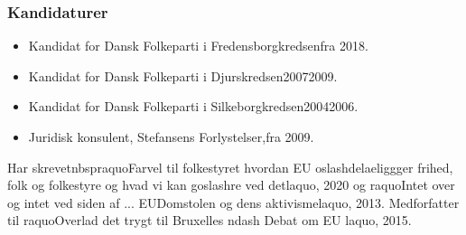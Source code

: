 \documentclass[11pt, a4paper]{awesome-cv}
\begin{document}
\begin{cvletter}
\subsubsection*{Kandidaturer}
\begin{itemize}
\item Kandidat for Dansk Folkeparti i Fredensborgkredsenfra 2018.
\item Kandidat for Dansk Folkeparti i Djurskredsen20072009.
\item Kandidat for Dansk Folkeparti i Silkeborgkredsen20042006.
\end{itemize}
\begin{itemize}
\item Juridisk konsulent, Stefansens Forlystelser,fra 2009.
\end{itemize}
Har skrevetnbspraquoFarvel til folkestyret hvordan EU oslashdelaeliggger frihed, folk og folkestyre  og hvad vi kan goslashre ved detlaquo, 2020 og raquoIntet over og intet ved siden af ...  EUDomstolen og dens aktivismelaquo, 2013. Medforfatter til raquoOverlad det trygt til Bruxelles ndash Debat om EU laquo, 2015.

\end{cvletter}
\end{document}
